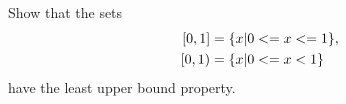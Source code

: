 \documentclass[main.tex]{subfiles}
\begin{document}
\subproblem{}\label{s03p15a}

Show that the sets
\begin{align*}
	[{0},{1}] &= \{x|0<=x<=1\},\\
	[{0},{1}) &= \{x|0<=x<1\}
\end{align*}
have the least upper bound property.

\todo{}
\end{document}
